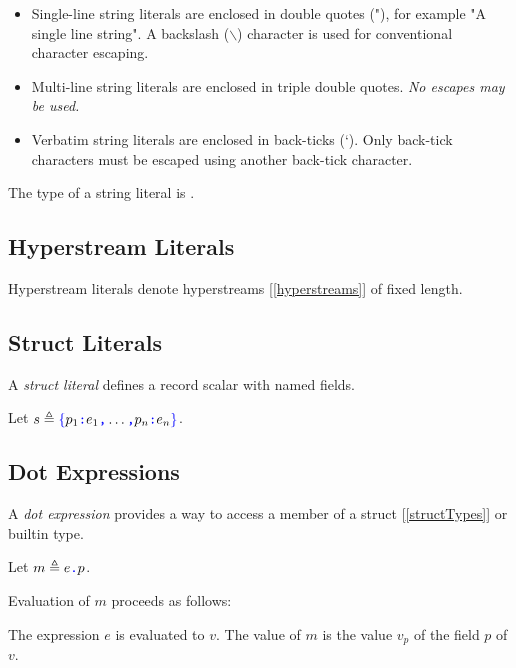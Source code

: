 \documentclass{article}
\begin{document}
\StringLiteral{}

\begin{itemize}
\item
Single-line string literals are enclosed in double quotes (\textsf{"}), for example \textsf{"}A single line string\textsf{"}. A backslash ($\backslash$) character is used for conventional character escaping.
\item Multi-line string literals are enclosed in triple double quotes.  {\em No escapes may be used.}
\item Verbatim string literals are enclosed in back-ticks (`). Only back-tick characters must be escaped using another back-tick character.
\end{itemize}

The type of a string literal is \STRING.

\subsection{Hyperstream Literals}
\label{hyperstreamLiterals}

\HyperstreamLiteral

Hyperstream literals denote hyperstreams [\ref{hyperstreams}] of fixed length. 


\subsection{Struct Literals}
\label{structLiterals}

A {\em struct literal} defines a record scalar with named fields.

\StructLiteral{}
\Property{}

Let $s \triangleq \texttt{\color{blue} $\{$}{}p_1\texttt{\color{blue} :}{} e_1\texttt{\color{blue} ,}{} \ldots \texttt{\color{blue} ,}{} p_n\texttt{\color{blue} :}{} e_n\texttt{\color{blue} $\}$}$.


\subsection{Dot Expressions}
\label{dotExpressions}

A {\em dot expression} provides a way to access a member of a struct [\ref{structTypes}] or builtin type.

\DotExpression{}

Let $m \triangleq e\texttt{\color{blue} .}{}p$.

Evaluation of $m$ proceeds as follows:

The expression $e$ is evaluated to $v$. The value of $m$ is the value $v_p$ of the field $p$ of $v$.
\end{document}
